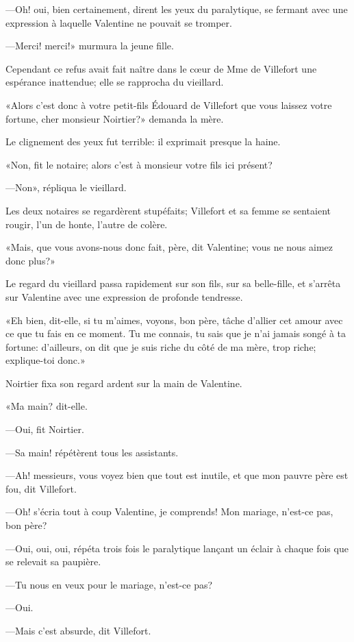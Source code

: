 —Oh! oui, bien certainement, dirent les yeux du paralytique, se fermant avec une expression à laquelle Valentine ne pouvait se tromper. 

—Merci! merci!» murmura la jeune fille. 

Cependant ce refus avait fait naître dans le cœur de Mme de Villefort une espérance inattendue; elle se rapprocha du vieillard. 

«Alors c'est donc à votre petit-fils Édouard de Villefort que vous laissez votre fortune, cher monsieur Noirtier?» demanda la mère. 

Le clignement des yeux fut terrible: il exprimait presque la haine. 

«Non, fit le notaire; alors c'est à monsieur votre fils ici présent? 

—Non», répliqua le vieillard. 

Les deux notaires se regardèrent stupéfaits; Villefort et sa femme se sentaient rougir, l'un de honte, l'autre de colère. 

«Mais, que vous avons-nous donc fait, père, dit Valentine; vous ne nous aimez donc plus?» 

Le regard du vieillard passa rapidement sur son fils, sur sa belle-fille, et s'arrêta sur Valentine avec une expression de profonde tendresse. 

«Eh bien, dit-elle, si tu m'aimes, voyons, bon père, tâche d'allier cet amour avec ce que tu fais en ce moment. Tu me connais, tu sais que je n'ai jamais songé à ta fortune: d'ailleurs, on dit que je suis riche du côté de ma mère, trop riche; explique-toi donc.» 

Noirtier fixa son regard ardent sur la main de Valentine.  

«Ma main? dit-elle. 

—Oui, fit Noirtier. 

—Sa main! répétèrent tous les assistants. 

—Ah! messieurs, vous voyez bien que tout est inutile, et que mon pauvre père est fou, dit Villefort. 

—Oh! s'écria tout à coup Valentine, je comprends! Mon mariage, n'est-ce pas, bon père? 

—Oui, oui, oui, répéta trois fois le paralytique lançant un éclair à chaque fois que se relevait sa paupière. 

—Tu nous en veux pour le mariage, n'est-ce pas? 

—Oui. 

—Mais c'est absurde, dit Villefort. 

